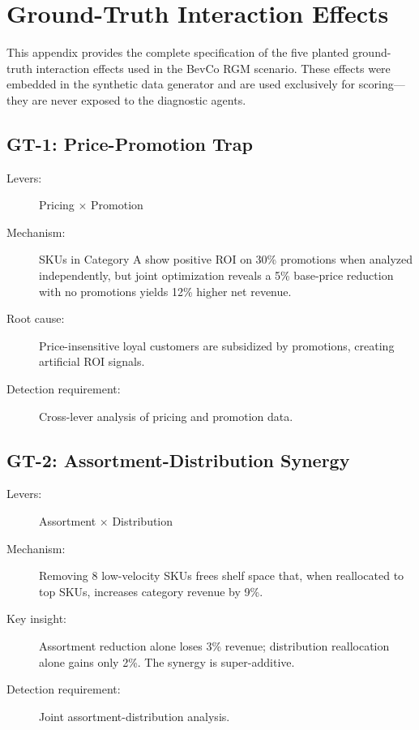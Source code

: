 \section{Ground-Truth Interaction Effects}
\label{app:groundtruth}

This appendix provides the complete specification of the five planted ground-truth interaction effects used in the BevCo RGM scenario.
These effects were embedded in the synthetic data generator and are used exclusively for scoring---they are never exposed to the diagnostic agents.

\subsection{GT-1: Price-Promotion Trap}

\begin{description}
    \item[Levers:] Pricing $\times$ Promotion
    \item[Mechanism:] SKUs in Category A show positive ROI on 30\% promotions when analyzed independently, but joint optimization reveals a 5\% base-price reduction with no promotions yields 12\% higher net revenue.
    \item[Root cause:] Price-insensitive loyal customers are subsidized by promotions, creating artificial ROI signals.
    \item[Detection requirement:] Cross-lever analysis of pricing and promotion data.
\end{description}

\subsection{GT-2: Assortment-Distribution Synergy}

\begin{description}
    \item[Levers:] Assortment $\times$ Distribution
    \item[Mechanism:] Removing 8 low-velocity SKUs frees shelf space that, when reallocated to top SKUs, increases category revenue by 9\%.
    \item[Key insight:] Assortment reduction alone loses 3\% revenue; distribution reallocation alone gains only 2\%. The synergy is super-additive.
    \item[Detection requirement:] Joint assortment-distribution analysis.
\end{description}

